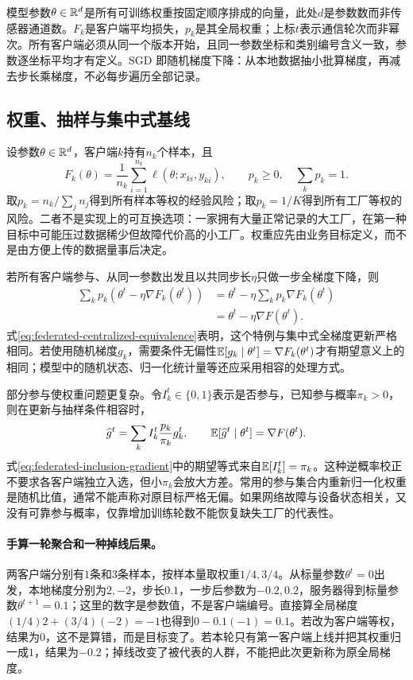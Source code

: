 模型参数$\theta\in\mathbb{R}^d$是所有可训练权重按固定顺序排成的向量，此处$d$是参数数而非传感器通道数。$F_k$是客户端平均损失，$p_k$是其全局权重；上标$t$表示通信轮次而非幂次。所有客户端必须从同一个版本开始，且同一参数坐标和类别编号含义一致，参数逐坐标平均才有定义。SGD 即随机梯度下降：从本地数据抽小批算梯度，再减去步长乘梯度，不必每步遍历全部记录。

\subsection{权重、抽样与集中式基线}
设参数$\theta\in\mathbb{R}^d$，客户端$k$持有$n_k$个样本，且
\begin{equation}
 F_k(\theta)=\frac1{n_k}\sum_{i=1}^{n_k}\ell(\theta;x_{ki},y_{ki}),
 \qquad p_k\geq0,\quad\sum_kp_k=1.
\end{equation}
取$p_k=n_k/\sum_jn_j$得到所有样本等权的经验风险；取$p_k=1/K$得到所有工厂等权的风险。二者不是实现上的可互换选项：一家拥有大量正常记录的大工厂，在第一种目标中可能压过数据稀少但故障代价高的小工厂。权重应先由业务目标定义，而不是由方便上传的数据量事后决定。

若所有客户端参与、从同一参数出发且以共同步长$\eta$只做一步全梯度下降，则
\begin{align}
 \sum_kp_k(\theta^t-\eta\nabla F_k(\theta^t))
 &=\theta^t-\eta\sum_kp_k\nabla F_k(\theta^t)\\
 &=\theta^t-\eta\nabla F(\theta^t).\label{eq:federated-centralized-equivalence}
\end{align}
式\eqref{eq:federated-centralized-equivalence}表明，这个特例与集中式全梯度更新严格相同。若使用随机梯度$g_k$，需要条件无偏性$\mathbb{E}[g_k\mid\theta^t]=\nabla F_k(\theta^t)$才有期望意义上的相同；模型中的随机状态、归一化统计量等还应采用相容的处理方式。

部分参与使权重问题更复杂。令$I_k^t\in\{0,1\}$表示是否参与，已知参与概率$\pi_k>0$，则在更新与抽样条件相容时，
\begin{equation}
 \widehat g^t=\sum_k I_k^t\frac{p_k}{\pi_k}g_k^t,
 \qquad \mathbb{E}[\widehat g^t\mid\theta^t]=\nabla F(\theta^t).\label{eq:federated-inclusion-gradient}
\end{equation}
式\eqref{eq:federated-inclusion-gradient}中的期望等式来自$\mathbb{E}[I_k^t]=\pi_k$。这种逆概率校正不要求各客户端独立入选，但小$\pi_k$会放大方差。常用的参与集合内重新归一化权重是随机比值，通常不能声称对原目标严格无偏。如果网络故障与设备状态相关，又没有可靠参与概率，仅靠增加训练轮数不能恢复缺失工厂的代表性。

\paragraph{手算一轮聚合和一种掉线后果。}
两客户端分别有$1$条和$3$条样本，按样本量取权重$1/4,3/4$。从标量参数$\theta^t=0$出发，本地梯度分别为$2,-2$，步长$0.1$，一步后参数为$-0.2,0.2$，服务器得到标量参数$\theta^{t+1}=0.1$；这里的数字是参数值，不是客户端编号。直接算全局梯度$(1/4)2+(3/4)(-2)=-1$也得到$0-0.1(-1)=0.1$。若改为客户端等权，结果为$0$，这不是算错，而是目标变了。若本轮只有第一客户端上线并把其权重归一成$1$，结果为$-0.2$；掉线改变了被代表的人群，不能把此次更新称为原全局梯度。

